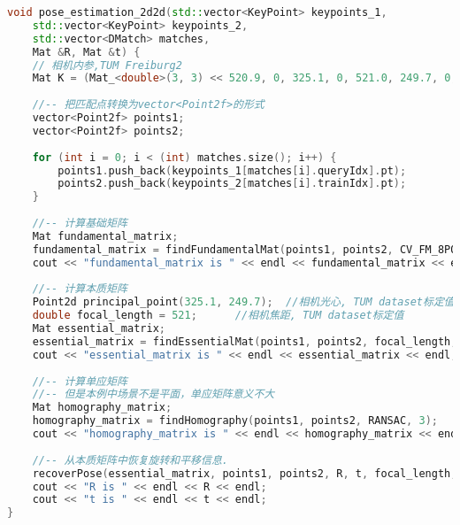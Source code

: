 \begin{lstlisting}[language=c++,caption=slambook2/ch7/pose_estimation_2d2d.cpp （片段）]
void pose_estimation_2d2d(std::vector<KeyPoint> keypoints_1,
    std::vector<KeyPoint> keypoints_2,
    std::vector<DMatch> matches,
    Mat &R, Mat &t) {
    // 相机内参,TUM Freiburg2
    Mat K = (Mat_<double>(3, 3) << 520.9, 0, 325.1, 0, 521.0, 249.7, 0, 0, 1);
    
    //-- 把匹配点转换为vector<Point2f>的形式
    vector<Point2f> points1;
    vector<Point2f> points2;
    
    for (int i = 0; i < (int) matches.size(); i++) {
        points1.push_back(keypoints_1[matches[i].queryIdx].pt);
        points2.push_back(keypoints_2[matches[i].trainIdx].pt);
    }
    
    //-- 计算基础矩阵
    Mat fundamental_matrix;
    fundamental_matrix = findFundamentalMat(points1, points2, CV_FM_8POINT);
    cout << "fundamental_matrix is " << endl << fundamental_matrix << endl;
    
    //-- 计算本质矩阵
    Point2d principal_point(325.1, 249.7);  //相机光心, TUM dataset标定值
    double focal_length = 521;      //相机焦距, TUM dataset标定值
    Mat essential_matrix;
    essential_matrix = findEssentialMat(points1, points2, focal_length, principal_point);
    cout << "essential_matrix is " << endl << essential_matrix << endl;
    
    //-- 计算单应矩阵
    //-- 但是本例中场景不是平面，单应矩阵意义不大
    Mat homography_matrix;
    homography_matrix = findHomography(points1, points2, RANSAC, 3);
    cout << "homography_matrix is " << endl << homography_matrix << endl;
    
    //-- 从本质矩阵中恢复旋转和平移信息.
    recoverPose(essential_matrix, points1, points2, R, t, focal_length, principal_point);
    cout << "R is " << endl << R << endl;
    cout << "t is " << endl << t << endl;
}
\end{lstlisting}

